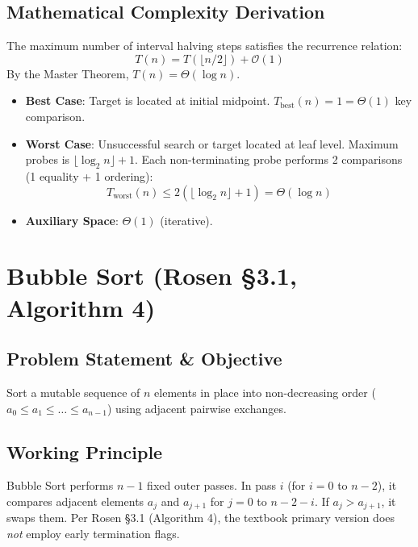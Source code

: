 \documentclass[11pt,a4paper,oneside]{report}
\theoremstyle{definition}
\begin{document}
\subsection{Mathematical Complexity Derivation}
The maximum number of interval halving steps satisfies the recurrence relation:
$$T(n) = T(\lfloor n/2 \rfloor) + \mathcal{O}(1)$$
By the Master Theorem, $T(n) = \Theta(\log n)$.
\begin{itemize}
    \item \textbf{Best Case}: Target is located at initial midpoint. $T_{\text{best}}(n) = 1 = \Theta(1)$ key comparison.
    \item \textbf{Worst Case}: Unsuccessful search or target located at leaf level. Maximum probes is $\lfloor \log_2 n \rfloor + 1$. Each non-terminating probe performs 2 comparisons (1 equality + 1 ordering):
    $$T_{\text{worst}}(n) \le 2(\lfloor \log_2 n \rfloor + 1) = \Theta(\log n)$$
    \item \textbf{Auxiliary Space}: $\Theta(1)$ (iterative).
\end{itemize}

\section{Bubble Sort (Rosen §3.1, Algorithm 4)}
\label{sec:bubble_sort}

\subsection{Problem Statement \& Objective}
Sort a mutable sequence of $n$ elements in place into non-decreasing order ($a_0 \le a_1 \le \dots \le a_{n-1}$) using adjacent pairwise exchanges.

\subsection{Working Principle}
Bubble Sort performs $n - 1$ fixed outer passes. In pass $i$ (for $i = 0$ to $n - 2$), it compares adjacent elements $a_j$ and $a_{j+1}$ for $j = 0$ to $n - 2 - i$. If $a_j > a_{j+1}$, it swaps them. Per Rosen §3.1 (Algorithm 4), the textbook primary version does \emph{not} employ early termination flags.
\end{document}
